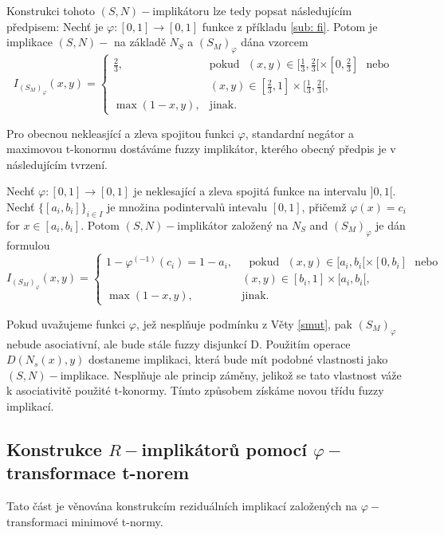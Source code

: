  Konstrukci tohoto $(S,N)-$implikátoru lze tedy popsat následujícím předpisem:
    Nech\v t je  $\varphi:[0,1]\rightarrow [0,1]$
funkce z příkladu \ref{sub: fi}.
Potom je implikace $(S,N)-$ na základě $N_S$ a $(S_M)_{\varphi}$ dána vzorcem
$$ I_{(S_M)_{\varphi}}(x,y) = \begin{cases} \frac{2}{3}, &\mbox {pokud~~}
(x,y)\in [\frac{1}{3},\frac{2}{3}[\times[0,\frac{2}{3}] \mbox{~~nebo~~}
\\ & (x,y)\in [\frac{2}{3},1]\times[\frac{1}{3},\frac{2}{3}[,
\\ \max(1-x,y), &\mbox {jinak.}
\end{cases} $$

Pro obecnou nekleasjící a zleva spojitou funkci $\varphi$, standardní negátor a maximovou t-konormu dostáváme fuzzy implikátor, kterého obecný předpis je v následujícím tvrzení.
\begin{sentence}
       Nechť $\varphi:[0,1]\rightarrow [0,1]$
je neklesající a zleva spojitá funkce na intervalu $]0,1[$.
Nechť
$\{[a_i,b_i]\}_{i\in I}$ je množina podintervalů intevalu $[0,1]$, přičemž $\varphi(x)=c_i$ for $x\in
[a_i,b_i]$.
Potom $(S,N)-$implikátor založený na $N_S$ and $(S_M)_{\varphi}$ je dán formulou
$$ I_{(S_M)_{\varphi}}(x,y) = \begin{cases} 1-\varphi^{(-1)}(c_i)=1-a_i, &\mbox {~~pokud~~}
(x,y)\in [a_i,b_i[\times[0,b_i] \mbox{~~nebo~~}
\\ & (x,y)\in [b_i,1]\times[a_i,b_i[,
\\ \max(1-x,y), &\mbox {jinak.}
\end{cases} $$

\end{sentence}

 Pokud uvažujeme funkci $\varphi$, jež nespl\v nuje podmínku z Věty \ref{smut}, pak $(S_M)_{\varphi}$ nebude asociativní, ale bude stále fuzzy disjunkcí D. Použitím operace $D(N_s(x),y)$ dostaneme implikaci, která bude mít podobné vlastnosti jako $(S,N)-$implikace. Nespl\v nuje ale princip záměny, jelikož se tato vlastnost váže k asociativitě použité t-konormy. Tímto způsobem získáme novou třídu fuzzy implikací.


\subsection{Konstrukce $R-$implik\'ator\r u pomoc\'i $\varphi-$transformace t-norem}
Tato část je věnována konstrukcím reziduálních implikací založených na $\varphi-$transformaci minimové t-normy. 

